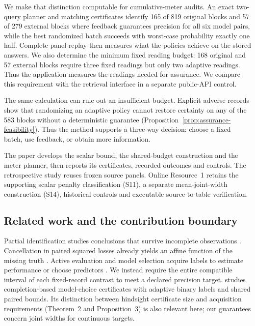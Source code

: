 \documentclass[12pt]{article}
\begin{document}
We make that distinction computable for cumulative-meter audits. An exact
two-query planner and matching certificates identify 165 of 819 original
blocks and 57 of 279 external blocks where feedback guarantees precision
for all six model pairs, while the best randomized batch succeeds with
worst-case probability exactly one half. Complete-panel replay then measures
what the policies achieve on the stored answers. We also determine the
minimum fixed reading budget: 168 original and 57 external blocks require
three fixed readings but only two adaptive readings. Thus the application
measures the readings needed for assurance. We compare this requirement with
the retrieval interface in a separate public-API control.

The same calculation can rule out an insufficient budget. Explicit adverse
records show that randomizing an adaptive policy cannot restore certainty
on any of the 583 blocks without a deterministic guarantee
(Proposition~\ref{prop:assurance-feasibility}). Thus the method supports a
three-way decision: choose a fixed batch, use feedback, or obtain more
information.

The paper develops the scalar bound, the shared-budget construction and the
meter planner, then reports its certificates, recorded outcomes and controls.
The retrospective study reuses frozen source panels. Online Resource~1
retains the supporting scalar penalty classification (S11), a separate
mean-joint-width construction (S14), historical controls and executable
source-to-table verification.

\subsection{Related work and the contribution boundary}
Partial identification studies conclusions that survive incomplete
observations \citep{manski,polo}. Cancellation in paired squared losses
already yields an affine function of the missing truth \citep{patton}.
Active evaluation and model selection acquire labels to estimate performance
or choose predictors \citep{sawade,hara,active,okanovic2025}. We instead
require the entire compatible interval of each fixed-record contrast to
meet a declared precision target. \citet[Theorem~1 and Proposition~1]{kuboyama2026}
studies completion-based model-choice certificates with adaptive binary
labels and shared paired bounds. Its distinction between hindsight certificate
size and acquisition requirements (Theorem~2 and Proposition~3) is also
relevant here; our guarantees concern joint widths for continuous targets.
\end{document}
